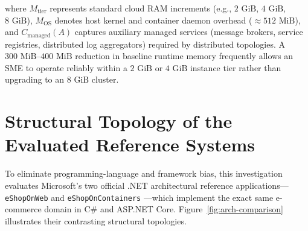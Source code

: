 where $M_{\text{tier}}$ represents standard cloud RAM increments (e.g., $2\text{ GiB}$, $4\text{ GiB}$, $8\text{ GiB}$), $M_{\text{OS}}$ denotes host kernel and container daemon overhead ($\approx 512\text{ MiB}$), and $C_{\text{managed}}(A)$ captures auxiliary managed services (message brokers, service registries, distributed log aggregators) required by distributed topologies. A $300\text{ MiB}$--$400\text{ MiB}$ reduction in baseline runtime memory frequently allows an SME to operate reliably within a $2\text{ GiB}$ or $4\text{ GiB}$ instance tier rather than upgrading to an $8\text{ GiB}$ cluster.

\section{Structural Topology of the Evaluated Reference Systems}
\label{sec:topologies}

To eliminate programming-language and framework bias, this investigation evaluates Microsoft's two official .NET architectural reference applications—\texttt{eShopOnWeb} \cite{msft_eshoponweb} and \texttt{eShopOnContainers} \cite{msft_eshoponcontainers}—which implement the exact same e-commerce domain in C\# and ASP.NET Core. Figure~\ref{fig:arch-comparison} illustrates their contrasting structural topologies.

